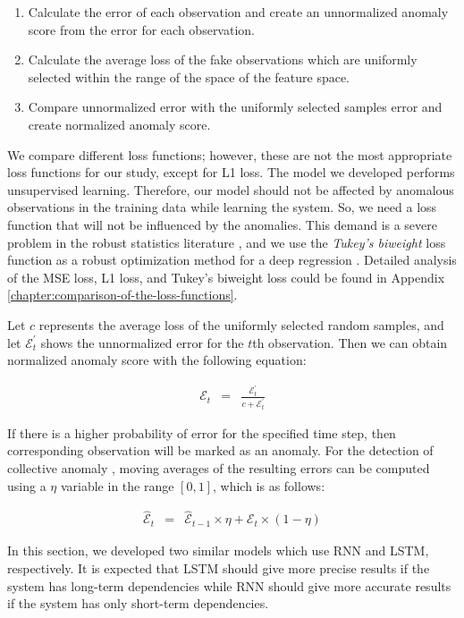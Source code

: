 \begin{enumerate}
    \item Calculate the error of each observation and create an unnormalized anomaly score from the error for each observation.
    \item Calculate the average loss of the fake observations which are uniformly selected within the range of the space of the feature space.
    \item Compare unnormalized error with the uniformly selected samples error and create normalized anomaly score.
\end{enumerate}

We compare different loss functions; however, these are not the most appropriate loss functions for our study, except for L1 loss. 
The model we developed performs unsupervised learning. Therefore, our model should not be affected by anomalous observations in the training data while learning the system. 
So, we need a loss function that will not be influenced by the anomalies.
This demand is a severe problem in the robust statistics literature \cite{black1996unification}, and we use the {\it Tukey's biweight} loss function as a robust optimization method for a deep regression \cite{belagiannis2015robust}. 
Detailed analysis of the MSE loss, L1 loss, and Tukey's biweight loss could be found in Appendix \ref{chapter:comparison-of-the-loss-functions}.

Let $c$ represents the average loss of the uniformly selected random samples, and let $\mathcal{E}^{\prime}_t$ shows the unnormalized error for the $t$th observation. Then we can obtain normalized anomaly score with the following equation:

\begin{eqnarray}
\mathcal{E}_t & = & \frac{\mathcal{E}^{\prime}_t}{c+\mathcal{E}^{\prime}_t}
\end{eqnarray}

If there is a higher probability of error for the specified time step, then corresponding observation will be marked as an anomaly. For the detection of collective anomaly \cite{bontemps2016collective}, moving averages of the resulting errors can be computed using a $\eta$ variable in the range $[0,1]$, which is as follows:

\begin{eqnarray}
    \hat{\mathcal{E}}_t &=& \hat{\mathcal{E}}_{t-1} \times \eta + \mathcal{E}_t \times \left(1 - \eta\right)  
\end{eqnarray}

In this section, we developed two similar models which use RNN and LSTM, respectively. It is expected that LSTM should give more precise results if the system has long-term dependencies while RNN should give more accurate results if the system has only short-term dependencies.